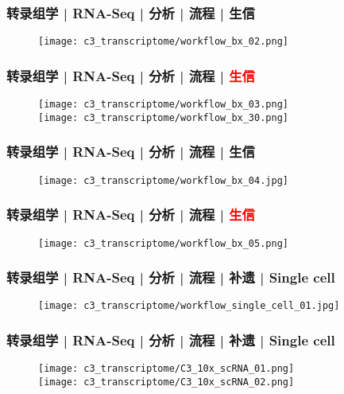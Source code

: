 \begin{frame}
  \frametitle{转录组学 | RNA-Seq | 分析 | 流程 | 生信}
  \begin{figure}
    \centering
    \texttt{[image: c3\_transcriptome/workflow\_bx\_02.png]}
  \end{figure}
\end{frame}

\begin{frame}
  \frametitle{转录组学 | RNA-Seq | 分析 | 流程 | \textcolor{red}{生信}}
  \begin{figure}
    \centering
    \texttt{[image: c3\_transcriptome/workflow\_bx\_03.png]}\\
    \vspace{1em}
    \texttt{[image: c3\_transcriptome/workflow\_bx\_30.png]}
  \end{figure}
\end{frame}

\begin{frame}
  \frametitle{转录组学 | RNA-Seq | 分析 | 流程 | 生信}
  \begin{figure}
    \centering
    \texttt{[image: c3\_transcriptome/workflow\_bx\_04.jpg]}
  \end{figure}
\end{frame}

\begin{frame}
  \frametitle{转录组学 | RNA-Seq | 分析 | 流程 | \textcolor{red}{生信}}
  \begin{figure}
    \centering
    \texttt{[image: c3\_transcriptome/workflow\_bx\_05.png]}
  \end{figure}
\end{frame}

\begin{frame}
  \frametitle{转录组学 | RNA-Seq | 分析 | 流程 | 补遗 | Single cell}
  \begin{figure}
    \centering
    \texttt{[image: c3\_transcriptome/workflow\_single\_cell\_01.jpg]}
  \end{figure}
\end{frame}

\begin{frame}
  \frametitle{转录组学 | RNA-Seq | 分析 | 流程 | 补遗 | Single cell}
  \begin{figure}
    \centering
    \texttt{[image: c3\_transcriptome/C3\_10x\_scRNA\_01.png]}\\
    \texttt{[image: c3\_transcriptome/C3\_10x\_scRNA\_02.png]}
  \end{figure}
\end{frame}

